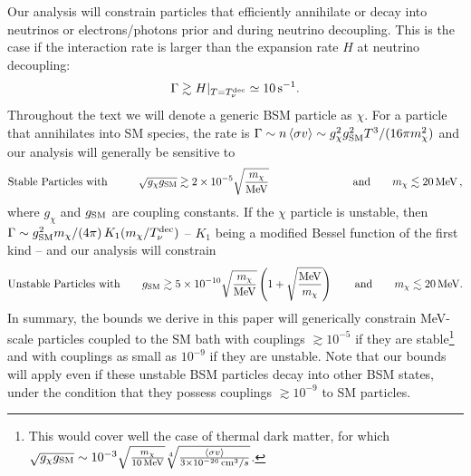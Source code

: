 \documentclass[notitlepage,letterpaper,natbib,aps,prd,onecolumn,amsmath,amsfonts,nofootinbib,preprintnumbers,superscriptaddress,secnumarabic,groupedaddress]{revtex4-1}
\begin{document}
Our analysis will constrain particles that efficiently annihilate or decay into neutrinos or electrons/photons prior and during neutrino decoupling. This is the case if the interaction rate is larger than the expansion rate $H$ at neutrino decoupling:
\begin{align}
    \Gamma \gtrsim H|_{T = T_\nu^{\rm dec}} \simeq 10 \,\text{s}^{-1}.
\end{align}
Throughout the text we will denote a generic BSM particle as $\chi$. For a particle that annihilates into SM species, the rate is $\Gamma \sim n\left<\sigma v \right> \sim g_\chi^2 g_{\rm SM}^2T^3/(16 \pi m_\chi^2)$ and our analysis will generally be sensitive to
\begin{align}\label{eq:Annihilation}
\text{Stable Particles with} \qquad  \,\,\,\,\,
    \sqrt{g_\chi g_{\rm SM}} \gtrsim  2\times 10^{-5} \sqrt{\frac{m_\chi}{\text{MeV}}} \qquad\qquad\qquad \,\,\,\,\,\,\,\,\,\, \text{and} \qquad m_\chi \lesssim 20\,\text{MeV}\,,
\end{align}
where $g_\chi$ and $g_{\rm SM}$ are coupling constants. If the $\chi$ particle is unstable, then $\Gamma \sim g_{\rm SM}^2m_\chi /(4\pi) \, K_{1}(m_\chi/T_{\nu}^{\rm dec})$ -- $K_{1}$ being a modified Bessel function of the first kind -- and our analysis will constrain
\begin{align}\label{eq:Decay}
\text{Unstable Particles with} \qquad 
    g_{\rm SM} \gtrsim  5\times 10^{-10} \sqrt{\frac{m_\chi}{\text{MeV}}}\left(1+ \sqrt{\frac{\text{MeV}}{m_\chi}} \right) \qquad \text{and} \qquad m_\chi \lesssim 20\,\text{MeV}.
\end{align}
In summary, the bounds we derive in this paper will generically constrain MeV-scale particles coupled to the SM bath with couplings $ \gtrsim 10^{-5}$ if they are stable\footnote{This would cover well the case of thermal dark matter, for which $\sqrt{g_\chi g_{\rm SM}} \sim 10^{-3} \sqrt{\frac{m_\chi}{10\,\text{MeV}}} \sqrt[4]{\frac{\left<\sigma v\right>}{3\times 10^{-26}\,\text{cm}^3/s} }$.} and with couplings as small as $10^{-9}$ if they are unstable. Note that our bounds will apply even if these unstable BSM particles decay into other BSM states, under the condition that they possess couplings $\gtrsim 10^{-9}$ to SM particles. 
\end{document}
